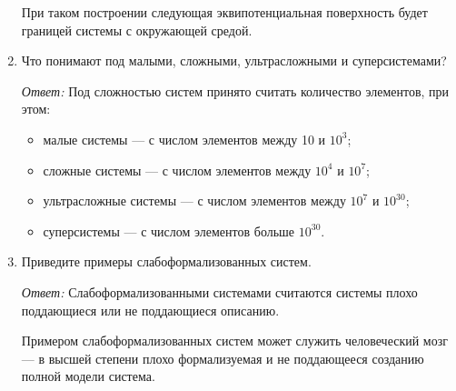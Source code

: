 \documentclass[10pt]{article}
\begin{document}
\begin{enumerate}
  При таком построении следующая эквипотенциальная поверхность будет границей системы с окружающей средой.

\item{Что понимают под малыми, сложными, ультрасложными и суперсистемами?}

  \emph{Ответ:} Под сложностью систем принято считать количество элементов, при этом:

  \begin{itemize}
  \item{малые системы --- с числом элементов между 10 и $10^3$;}
  \item{сложные системы --- с числом элементов между $10^4$ и $10^7$;}
  \item{ультрасложные системы --- с числом элементов между $10^7$ и $10^{30}$;}
  \item{суперсистемы --- с числом элементов больше $10^{30}$.}
  \end{itemize}

\item{Приведите примеры слабоформализованных систем.}

  \emph{Ответ:} Слабоформализованными системами считаются системы плохо поддающиеся или не поддающиеся описанию.

  Примером слабоформализованных систем может служить человеческий мозг --- в высшей степени плохо формализуемая и не поддающееся созданию полной модели система.
\end{enumerate}
\end{document}
